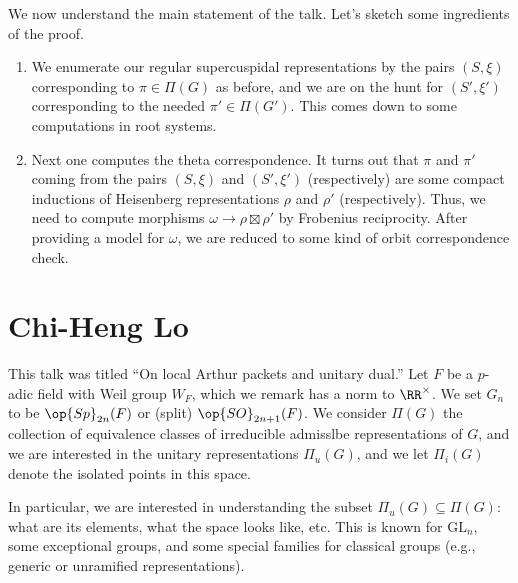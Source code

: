\documentclass{article}
\begin{document}
We now understand the main statement of the talk. Let's sketch some ingredients of the proof.
\begin{enumerate}
	\item We enumerate our regular supercuspidal representations by the pairs $(S,\xi)$ corresponding to $\pi\in\Pi(G)$ as before, and we are on the hunt for $(S',\xi')$ corresponding to the needed $\pi'\in\Pi(G')$. This comes down to some computations in root systems.
	\item Next one computes the theta correspondence. It turns out that $\pi$ and $\pi'$ coming from the pairs $(S,\xi)$ and $(S',\xi')$ (respectively) are some compact inductions of Heisenberg representations $\rho$ and $\rho'$ (respectively). Thus, we need to compute morphisms $\omega\to\rho\boxtimes\rho'$ by Frobenius reciprocity. After providing a model for $\omega$, we are reduced to some kind of orbit correspondence check.
\end{enumerate}

\section{Chi-Heng Lo}
This talk was titled ``On local Arthur packets and unitary dual.'' Let $F$ be a $p$-adic field with Weil group $W_F$, which we remark has a norm to $\RR^\times$. We set $G_n$ to be $\op{Sp}_{2n}(F)$ or (split) $\op{SO}_{2n+1}(F)$. We consider $\Pi(G)$ the collection of equivalence classes of irreducible admisslbe representations of $G$, and we are interested in the unitary representations $\Pi_u(G)$, and we let $\Pi_i(G)$ denote the isolated points in this space.

In particular, we are interested in understanding the subset $\Pi_u(G)\subseteq\Pi(G)$: what are its elements, what the space looks like, etc. This is known for $\mathrm{GL}_n$, some exceptional groups, and some special families for classical groups (e.g., generic or unramified representations).
\end{document}
